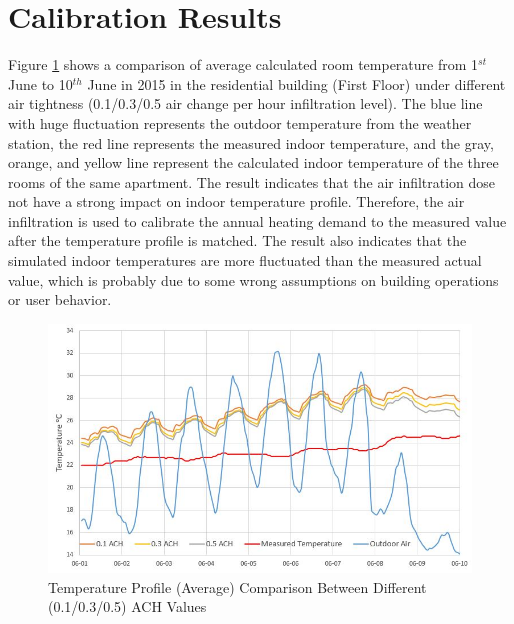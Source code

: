 \documentclass[a4paper, oneside]{discothesis}
\begin{document}
		



	\newpage
	\section{Calibration Results}

			Figure \ref{fig:ACH_Compare} shows a comparison of average calculated room temperature from 1$^{st}$ June to 10$^{th}$ June in 2015 in the residential building (First Floor) under different air tightness (0.1/0.3/0.5 air change per hour infiltration level). The blue line with huge fluctuation represents the outdoor temperature from the weather station, the red line represents the measured indoor temperature, and the gray, orange, and yellow line represent the calculated indoor temperature of the three rooms of the same apartment. The result indicates that the air infiltration dose not have a strong impact on indoor temperature profile. Therefore, the air infiltration is used to calibrate the annual heating demand to the measured value after the temperature profile is matched. The result also indicates that the simulated indoor temperatures are more fluctuated than the measured actual value, which is probably due to some wrong assumptions on building operations or user behavior.\\
		
			\begin{figure}[H]
			\centering
			\includegraphics[scale=0.75]{ACH_Compare.JPG}
			\caption{Temperature Profile (Average) Comparison Between Different (0.1/0.3/0.5) ACH Values}
			\label{fig:ACH_Compare}
			\end{figure}
\end{document}
